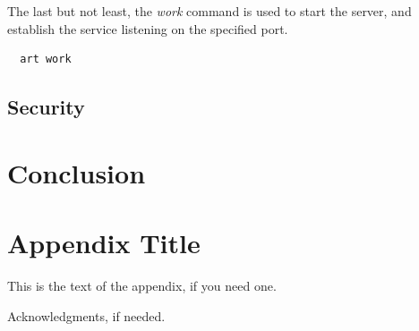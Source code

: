 \documentclass[preprint,numbers,numberedpars,10pt]{sigplanconf}
\begin{document}
The last but not least, the {\it work} command is used to start the server, and establish the service listening on the specified port.
\begin{lstlisting}
  art work
\end{lstlisting}

\subsection{Security}

\section{Conclusion}


\appendix
\section{Appendix Title}

This is the text of the appendix, if you need one.

\acks

Acknowledgments, if needed.




\softraggedright


\end{document}
